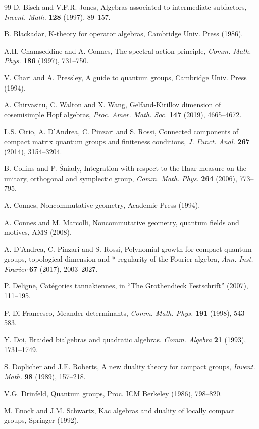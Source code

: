 \documentclass[12pt]{amsbook}
\begin{document}
\begin{thebibliography}{99}
D. Bisch and V.F.R. Jones, Algebras associated to intermediate subfactors, {\em Invent. Math.} {\bf 128} (1997), 89--157.

B. Blackadar, K-theory for operator algebras, Cambridge Univ. Press (1986).

A.H. Chamseddine and A. Connes, The spectral action principle, {\em Comm. Math. Phys.} {\bf 186} (1997), 731--750.

V. Chari and A. Pressley, A guide to quantum groups, Cambridge Univ. Press (1994).

A. Chirvasitu, C. Walton and X. Wang, Gelfand-Kirillov dimension of cosemisimple Hopf algebras, {\em Proc. Amer. Math. Soc.} {\bf 147} (2019), 4665--4672.

L.S. Cirio, A. D'Andrea, C. Pinzari and S. Rossi, Connected components of compact matrix quantum groups and finiteness conditions, {\em J. Funct. Anal.} {\bf  267} (2014), 3154--3204.

B. Collins and P. \'Sniady, Integration with respect to the Haar measure on the unitary, orthogonal and symplectic group, {\em Comm. Math. Phys.} {\bf 264} (2006), 773--795.

A. Connes, Noncommutative geometry, Academic Press (1994).

A. Connes and M. Marcolli, Noncommutative geometry, quantum fields and motives, AMS (2008).

A. D'Andrea, C. Pinzari and S. Rossi, Polynomial growth for compact quantum groups, topological dimension and *-regularity of the Fourier algebra, {\em Ann. Inst. Fourier} {\bf 67} (2017), 2003--2027.

P. Deligne, Cat\'egories tannakiennes, in ``The Grothendieck Festschrift'' (2007), 111--195.

P. Di Francesco, Meander determinants, {\em Comm. Math. Phys.} {\bf 191} (1998), 543--583.

Y. Doi, Braided bialgebras and quadratic algebras, {\em Comm. Algebra} {\bf 21} (1993), 1731--1749.

S. Doplicher and J.E. Roberts, A new duality theory for compact groups, {\em  Invent. Math.} {\bf 98} (1989), 157--218.

V.G. Drinfeld, Quantum groups, Proc. ICM Berkeley (1986), 798--820.

M. Enock and J.M. Schwartz, Kac algebras and duality of locally compact groups, Springer (1992).


\end{thebibliography}
\end{document}

